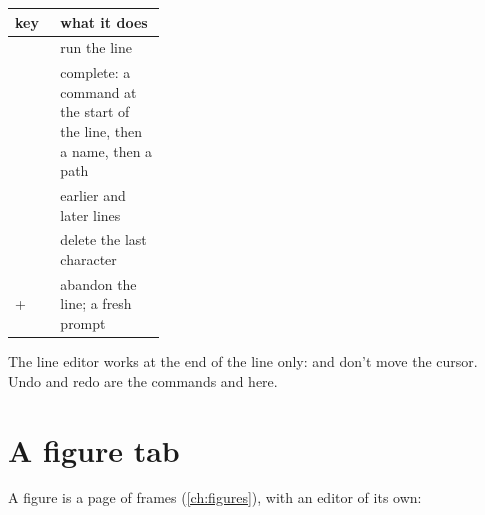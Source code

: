 \begin{center}\small
\begin{tabularx}{\linewidth}{@{}>{\raggedright}p{0.3\linewidth}L@{}}\toprule
\sffamily\bfseries key & \sffamily\bfseries what it does \\\midrule
{} & run the line \\
 & complete: a command at the start of the line, then a name, then a path \\
  & earlier and later lines \\
 & delete the last character \\
+ & abandon the line; a fresh prompt \\
\bottomrule\end{tabularx}
\end{center}

The line editor works at the end of the line only:  and  don't move the cursor. Undo and
redo are the commands  and  here.

\section{A figure tab}

A figure is a page of  frames (\cref{ch:figures}), with an editor of its own:

